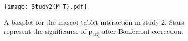 \begin{figure}[hbt!]
    \centering
    \texttt{[image: Study2(M-T).pdf]}
    \caption[]{A boxplot for the mascot-tablet interaction in study-2.
    Stars represent the significance of p\textsubscript{adj} after Bonferroni correction.\footnotemark}
    \label{fig:MT2}
\end{figure}
